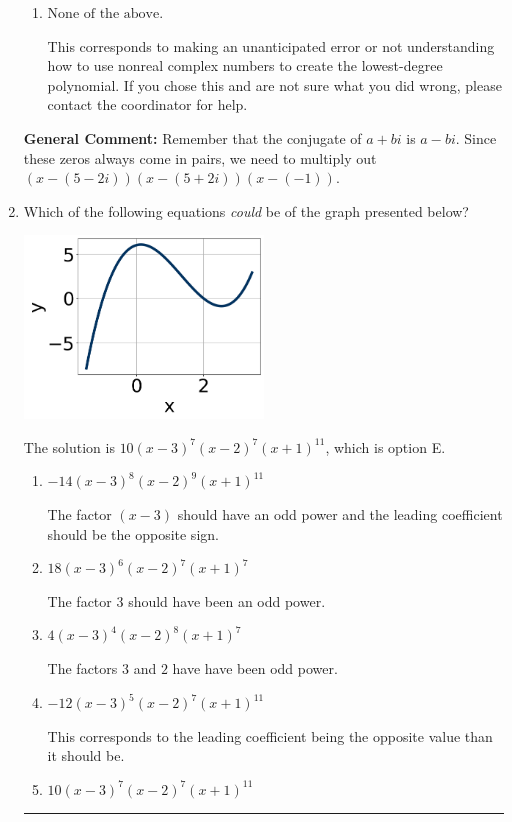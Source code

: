 \documentclass{extbook}[14pt]
\newcommand{\litem}[1]{\item #1

\rule{\textwidth}{0.4pt}}
\begin{document}
\begin{enumerate}
{\begin{enumerate}[label=\Alph*.]
$x^{3} +9 x^{2} +19 x -29$, which corresponds to multiplying out $(x-(5 - 2 i))(x-(5 + 2 i))(x -1)$.
\item \( \text{None of the above.} \)

This corresponds to making an unanticipated error or not understanding how to use nonreal complex numbers to create the lowest-degree polynomial. If you chose this and are not sure what you did wrong, please contact the coordinator for help.
\end{enumerate}

\textbf{General Comment:} Remember that the conjugate of $a+bi$ is $a-bi$. Since these zeros always come in pairs, we need to multiply out $(x-(5 - 2 i))(x-(5 + 2 i))(x-(-1))$.
}
\litem{
Which of the following equations \textit{could} be of the graph presented below?

\begin{center}
    \includegraphics[width=0.5\textwidth]{../Figures/polyGraphToFunctionCopyA.png}
\end{center}



The solution is \( 10(x - 3)^{7} (x - 2)^{7} (x + 1)^{11} \), which is option E.\begin{enumerate}[label=\Alph*.]
\item \( -14(x - 3)^{8} (x - 2)^{9} (x + 1)^{11} \)

The factor $(x - 3)$ should have an odd power and the leading coefficient should be the opposite sign.
\item \( 18(x - 3)^{6} (x - 2)^{7} (x + 1)^{7} \)

The factor $3$ should have been an odd power.
\item \( 4(x - 3)^{4} (x - 2)^{8} (x + 1)^{7} \)

The factors $3$ and $2$ have have been odd power.
\item \( -12(x - 3)^{5} (x - 2)^{7} (x + 1)^{11} \)

This corresponds to the leading coefficient being the opposite value than it should be.
\item \( 10(x - 3)^{7} (x - 2)^{7} (x + 1)^{11} \)


\end{enumerate}}
\end{enumerate}
\end{document}
